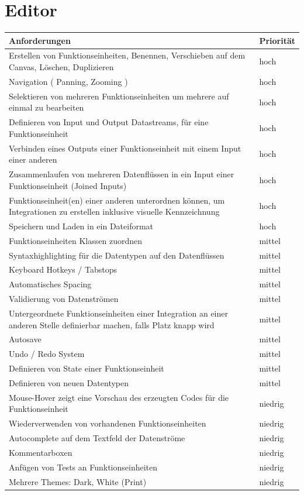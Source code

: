 \section{Editor}

\begin{tabularx}{\textwidth}{X|l}
Anforderungen & Priorität\\
\hline
Erstellen von Funktionseinheiten, Benennen, Verschieben auf dem Canvas, Löschen, Duplizieren & hoch\\ \hline
Navigation ( Panning, Zooming ) & hoch\\ \hline
Selektieren von mehreren Funktionseinheiten um mehrere auf einmal zu bearbeiten & hoch\\ \hline
Definieren von Input und Output Datastreams, für eine Funktionseinheit & hoch\\ \hline
Verbinden eines Outputs einer Funktionseinheit mit einem Input einer anderen & hoch\\ \hline
Zusammenlaufen von mehreren Datenflüssen in ein Input einer Funktionseinheit (Joined Inputs) & hoch\\ \hline
Funktionseinheit(en) einer anderen unterordnen können, um Integrationen zu erstellen inklusive visuelle Kennzeichnung & hoch\\ \hline
Speichern und Laden in ein Dateiformat & hoch\\ \hline
Funktionseinheiten Klassen zuordnen & mittel\\ \hline
Syntaxhighlighting für die Datentypen auf den Datenflüssen & mittel\\ \hline
Keyboard Hotkeys / Tabstops & mittel\\ \hline
Automatisches Spacing & mittel\\ \hline
Validierung von Datenströmen & mittel\\ \hline
Untergeordnete Funktionseinheiten einer Integration an einer anderen Stelle definierbar machen, falls Platz knapp wird & mittel\\ \hline
Autosave & mittel\\ \hline
Undo / Redo System & mittel\\ \hline
Definieren von State einer Funktionseinheit & mittel\\ \hline
Definieren von neuen Datentypen & mittel\\ \hline
Mouse-Hover zeigt eine Vorschau des erzeugten Codes für die Funktionseinheit & niedrig\\ \hline
Wiederverwenden von vorhandenen Funktionseinheiten & niedrig\\ \hline
Autocomplete auf dem Textfeld der Datenströme & niedrig\\ \hline
Kommentarboxen & niedrig\\ \hline
Anfügen von Tests an Funktionseinheiten & niedrig\\ \hline
Mehrere Themes: Dark, White (Print) & niedrig\\ \hline
\end{tabularx}


